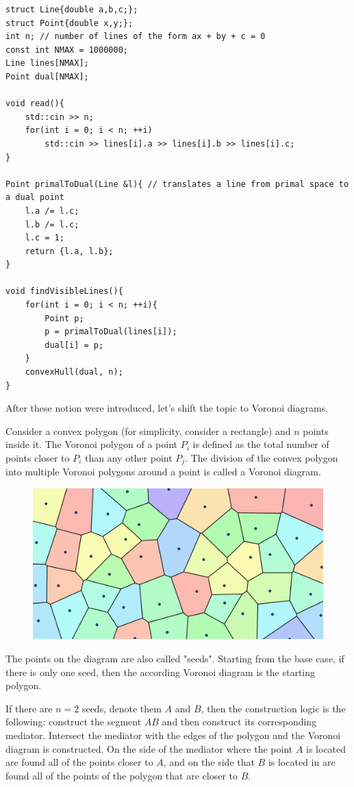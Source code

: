 \documentclass[letterpaper]{article}
\begin{document}
\begin{lstlisting}
struct Line{double a,b,c;};
struct Point{double x,y;};
int n; // number of lines of the form ax + by + c = 0
const int NMAX = 1000000;
Line lines[NMAX];
Point dual[NMAX];

void read(){
    std::cin >> n;
    for(int i = 0; i < n; ++i)
        std::cin >> lines[i].a >> lines[i].b >> lines[i].c;
}

Point primalToDual(Line &l){ // translates a line from primal space to a dual point
    l.a /= l.c;
    l.b /= l.c;
    l.c = 1;
    return {l.a, l.b};
}

void findVisibleLines(){
    for(int i = 0; i < n; ++i){
        Point p;
        p = primalToDual(lines[i]);
        dual[i] = p;
    }
    convexHull(dual, n);
}
\end{lstlisting}

After these notion were introduced, let's shift the topic to Voronoi diagrams.

Consider a convex polygon (for simplicity, consider a rectangle) and $n$ points inside it. The Voronoi polygon of a point $P_i$ is defined as the total number of points closer to $P_i$ than any other point $P_j$. The division of the convex polygon into multiple Voronoi polygons around a point is called a Voronoi diagram.

\begin{figure} [h!]
\centering
\includegraphics[width=1\textwidth]{pngOfDiagrams/voronoi2d1.png}
\end{figure}

The points on the diagram are also called "seeds". Starting from the base case, if there is only one seed, then the according Voronoi diagram is the starting polygon. 

If there are $n = 2$ seeds, denote them $A$ and $B$, then the construction logic is the following: construct the segment $AB$ and then construct its corresponding mediator. Intersect the mediator with the edges of the polygon and the Voronoi diagram is constructed. On the side of the mediator where the point $A$ is located are found all of the points closer to $A$, and on the side that $B$ is located in are found all of the points of the polygon that are closer to $B$. 
\end{document}
